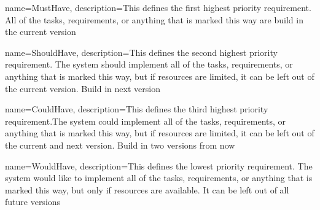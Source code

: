 {	name={MustHave},
	description={This defines the first highest priority requirement.
	All of the tasks, requirements, or anything that is marked this way are
	build in the current version}
}

{	name={ShouldHave},
	description={This defines the second highest priority requirement. The system should implement 
	all of the tasks, requirements, or anything that is marked this way, but if 
	resources are limited, it can be left out of the current version.
	Build in next version}
}

{	name={CouldHave},
	description={This defines the third highest priority requirement.The system could implement 
	all of the tasks, requirements, or anything that is marked this way, but if 
	resources are limited, it can be left out of the current and next version.
	Build in two versions from now}
}

{	name={WouldHave},
	description={This defines the lowest priority requirement.  The system would like to implement 
all of the tasks, requirements, or anything that is marked this way, but only
if resources are available. It can be left out of all future versions}
}
